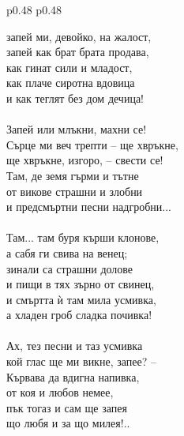 \documentclass[12pt,a4paper]{article}
\begin{document}
\begin{tabular}{p{0.48\textwidth} p{0.48\textwidth}}
\begin{minipage}[t]{\linewidth}
запей ми, девойко, на жалост,\\
запей как брат брата продава,\\
как гинат сили и младост,\\
как плаче сиротна вдовица\\
и как теглят без дом дечица!\\
\\
Запей или млъкни, махни се!\\
Сърце ми веч трепти – ще хвръкне,\\
ще хвръкне, изгоро, – свести се!\\
Там, де земя гърми и тътне\\
от викове страшни и злобни\\
и предсмъртни песни надгробни...\\
\\
Там... там буря кърши клонове,\\
а сабя ги свива на венец;\\
зинали са страшни долове\\
и пищи в тях зърно от свинец,\\
и смъртта ѝ там мила усмивка,\\
а хладен гроб сладка почивка!\\
\\
Ах, тез песни и таз усмивка\\
кой глас ще ми викне, запее? –\\
Кървава да вдигна напивка,\\
от коя и любов немее,\\
пък тогаз и сам ще запея\\
що любя и за що милея!..\\
\end{minipage}
\end{tabular}
\end{document}
